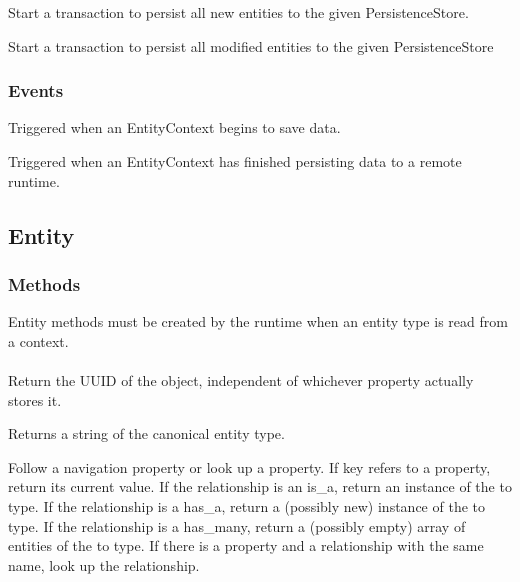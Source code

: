 \documentclass{article}
\begin{document}
	{Start a transaction to persist all new entities to the given
		PersistenceStore.}
	{
	}

	{Start a transaction to persist all modified entities to the given
		PersistenceStore}
	{
	}

\subsubsection{Events}
	{Triggered when an EntityContext begins to save data.}
	{}

	{Triggered when an EntityContext has finished persisting data to a remote
	runtime.}
	{}

\subsection{Entity}
\subsubsection{Methods}
Entity methods must be created by the runtime when an entity type is read from a
context.
\\
\\
	{Return the UUID of the object, independent of whichever property
	actually stores it.}
	{
	}

	{Returns a string of the canonical entity type.}
	{
	}

	{Follow a navigation property or look up a property. If key refers to a
	property, return its current value. If the relationship is an {\ilcode is\_a},
	return an instance of the {\ilcode to} type. If the relationship is a
	{\ilcode has\_a}, return a (possibly new) instance of the {\ilcode to} type.
	If the relationship is a {\ilcode has\_many}, return a (possibly empty)
	array of entities of the {\ilcode to} type. If there is a property and
	a relationship with the same name, look up the relationship.}
	{
	}
\end{document}
